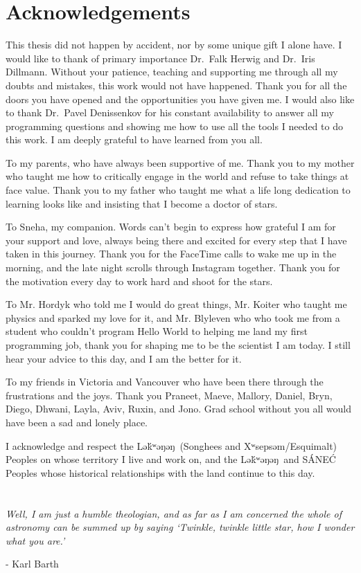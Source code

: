 \newpage
{}

\section*{\large Acknowledgements}
\noindent This thesis did not happen by accident, nor by some unique gift I alone have.
I would like to thank of primary importance Dr.\ Falk Herwig and Dr.\ Iris Dillmann.
Without your patience, teaching and supporting me through all my doubts and mistakes, this work would not have happened.
Thank you for all the doors you have opened and the opportunities you have given me.
I would also like to thank Dr.\ Pavel Denissenkov for his constant availability to answer all my programming questions and showing me how to use all the tools I needed to do this work.
I am deeply grateful to have learned from you all.

To my parents, who have always been supportive of me. 
Thank you to my mother who taught me how to critically engage in the world and refuse to take things at face value.
Thank you to my father who taught me what a life long dedication to learning looks like and insisting that I become a doctor of stars.

To Sneha, my companion. Words can't begin to express how grateful I am for your support and love, always being there and excited for every step that I have taken in this journey.
Thank you for the FaceTime calls to wake me up in the morning, and the late night scrolls through Instagram together.
Thank you for the motivation every day to work hard and shoot for the stars.

To Mr. Hordyk who told me I would do great things, Mr. Koiter who taught me physics and sparked my love for it, and Mr. Blyleven who who took me from a student who couldn't program Hello World to helping me land my first programming job, thank you for shaping me to be the scientist I am today.
I still hear your advice to this day, and I am the better for it.

To my friends in Victoria and Vancouver who have been there through the frustrations and the joys.
Thank you Praneet, Maeve, Mallory, Daniel, Bryn, Diego, Dhwani, Layla, Aviv, Ruxin, and Jono. 
Grad school without you all would have been a sad and lonely place.

I acknowledge and respect the Lə\'{k}ʷəŋəŋ\ (Songhees and Xʷsepsəm/Esquimalt) Peoples on whose territory I live and work on, and the Lə\'{k}ʷəŋəŋ\ and SÁNE\'C Peoples whose historical relationships with the land continue to this day.
\\\\\\
\textit{Well, I am just a humble theologian, and as far as I am concerned the whole of astronomy can be summed up by saying `Twinkle, twinkle little star, how I wonder what you are.'}
\begin{flushright}
- Karl Barth
\end{flushright}
